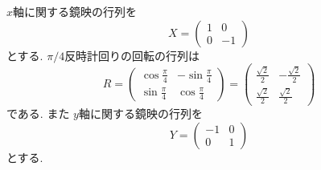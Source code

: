 \documentclass[uplatex,dvipdfmx,a4paper,14pt]{jsarticle}
\begin{document}
$x$軸に関する鏡映の行列を
\[
X=\begin{pmatrix}1&0\\0&-1\end{pmatrix}
\]
とする. $\pi/4$反時計回りの回転の行列は
\[
R=\begin{pmatrix}
\cos\frac{\pi}{4}&-\sin\frac{\pi}{4}\\
\sin\frac{\pi}{4}&\cos\frac{\pi}{4}
\end{pmatrix}
=
\begin{pmatrix}
\frac{\sqrt2}{2}&-\frac{\sqrt2}{2}\\
\frac{\sqrt2}{2}&\frac{\sqrt2}{2}
\end{pmatrix}
\]
である. また $y$軸に関する鏡映の行列を
\[
Y=\begin{pmatrix}-1&0\\0&1\end{pmatrix}
\]
とする.
\end{document}
